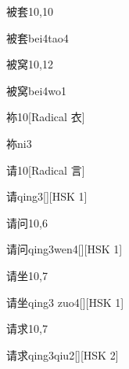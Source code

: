 \begin{entry}{被套}{10,10}
  \begin{phonetics}{被套}{bei4tao4}
  \end{phonetics}
\end{entry}

\begin{entry}{被窝}{10,12}
  \begin{phonetics}{被窝}{bei4wo1}
  \end{phonetics}
\end{entry}

\begin{entry}{袮}{10}[Radical 衣]
  \begin{phonetics}{袮}{ni3}
  \end{phonetics}
\end{entry}

\begin{entry}{请}{10}[Radical 言]
  \begin{phonetics}{请}{qing3}[][HSK 1]
  \end{phonetics}
\end{entry}

\begin{entry}{请问}{10,6}
  \begin{phonetics}{请问}{qing3wen4}[][HSK 1]
  \end{phonetics}
\end{entry}

\begin{entry}{请坐}{10,7}
  \begin{phonetics}{请坐}{qing3 zuo4}[][HSK 1]
  \end{phonetics}
\end{entry}

\begin{entry}{请求}{10,7}
  \begin{phonetics}{请求}{qing3qiu2}[][HSK 2]
  \end{phonetics}
\end{entry}

